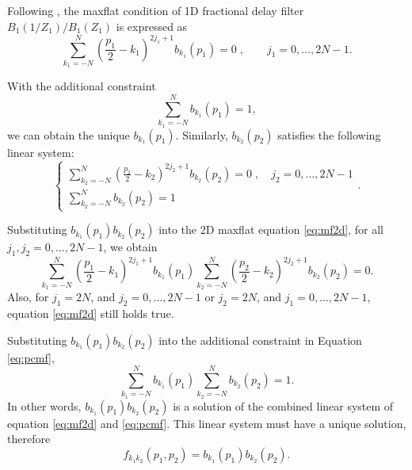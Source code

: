 
Following \cite{thiran1971recursive}, 
the maxflat condition of 1D fractional delay
filter $B_1(1/Z_1)/B_1(Z_1)$ is expressed as
\begin{equation}
\sum_{k_1=-N}^N(\frac{p_1}{2}-k_1)^{2j_1+1}b_{k_1}(p_1)=0\;,
\qquad j_1=0,\dots,2N-1.
\end{equation}

With the additional constraint \cite[]{chen:2012a}
\begin{equation}
\sum_{k_1=-N}^Nb_{k_1}(p_1)=1,
\end{equation}
we can obtain the unique $b_{k_1}(p_1)$.
Similarly, $b_{k_2}(p_2)$ satisfies 
the following linear system:
\begin{equation}
\left\{\begin{array}{l}
\displaystyle{\sum_{k_2=-N}^N(\frac{p_2}{2}-k_2)^{2j_2+1}b_{k_2}(p_2)=0}\;,
 \quad j_2=0,\dots,2N-1 \\
\displaystyle{\sum_{k_2=-N}^Nb_{k_2}(p_2)=1}
\end{array}\right..
\end{equation}

Substituting $b_{k_1}(p_1)b_{k_2}(p_2)$ into 
the 2D maxflat equation \ref{eq:mf2d}, for all
$j_1,j_2=0,\dots,2N-1$, we obtain
\begin{equation}
\sum_{k_1=-N}^N(\frac{p_1}{2}-k_1)^{2j_1+1}b_{k_1}(p_1)
\sum_{k_2=-N}^N(\frac{p_2}{2}-k_2)^{2j_2+1}b_{k_2}(p_2)=0.
\end{equation}
Also, for
$j_1=2N$, and $j_2=0,\dots,2N-1$ 
or $j_2=2N$, and $j_1=0,\dots,2N-1$,
equation \ref{eq:mf2d} still holds true.

Substituting $b_{k_1}(p_1)b_{k_2}(p_2)$ into 
the additional constraint in Equation \ref{eq:pcmf},
\begin{equation}
\sum_{k_1=-N}^Nb_{k_1}(p_1)\sum_{k_2=-N}^Nb_{k_2}(p_2)=1.
\end{equation}
In other words, 
$b_{k_1}(p_1)b_{k_2}(p_2)$ is a solution of 
the combined linear system of equation \ref{eq:mf2d} and \ref{eq:pcmf}.
This linear system must have a unique solution, therefore
\begin{equation}
f_{k_1k_2}(p_1,p_2)=b_{k_1}(p_1)b_{k_2}(p_2).
\end{equation}




